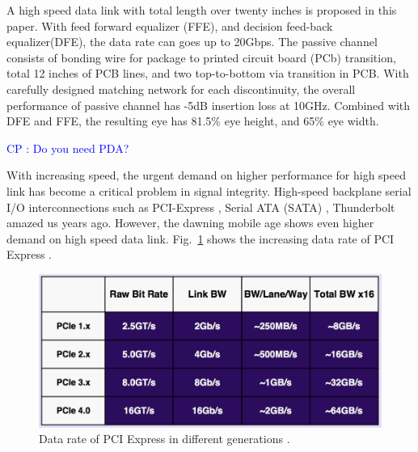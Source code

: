 \documentclass{book}  %
\newcommand{\cphighlight}[1]{\Huge\textcolor{blue}{CP : #1}\normalsize}
\newenvironment{abstract}{\begin{piersabstract}}{%
	\end{piersabstract}\ignorespacesafterend%
}
\renewcommand{\section}[1]{\psection{#1}}
\begin{document}
\begin{paper}
	
\begin{abstract}
A high speed data link with total length over twenty inches is proposed in this paper. With feed forward equalizer (FFE), and decision feed-back equalizer(DFE), the data rate can goes up to 20Gbps. The passive channel consists of bonding wire for package to printed circuit board (PCb) transition, total 12 inches of PCB lines, and two top-to-bottom via transition in PCB. With carefully designed matching network for each discontinuity, the overall performance of passive channel has -5dB insertion loss at 10GHz. Combined with DFE and FFE, the resulting eye has 81.5\% eye height, and 65\% eye width. 

\cphighlight{Do you need PDA?}
\end{abstract}

\section{Introduction}
With increasing speed, the urgent demand on higher performance for high speed link has become a critical problem in signal integrity. High-speed backplane serial I/O interconnections such as PCI-Express \cite{na_welcome_pcisig}, Serial ATA (SATA) \cite{I_serial_ata}, Thunderbolt \cite{na_thunderbolt_technology} amazed us years ago. However, the dawning mobile age shows even higher demand on high speed data link. Fig.~\ref{fig:pcie_speed} shows the increasing data rate of PCI Express \cite{na_welcome_pcisig}. \\

\begin{figure}[htbp!]
	\centering
	\includegraphics[width=0.8\columnwidth]{./img/pcie-4-0-bandwidth.png}
	\caption{Data rate of PCI Express in different generations \cite{C_doublespeed_nextgen}.}
	\label{fig:pcie_speed}
\end{figure}


\end{paper}
\end{document}
